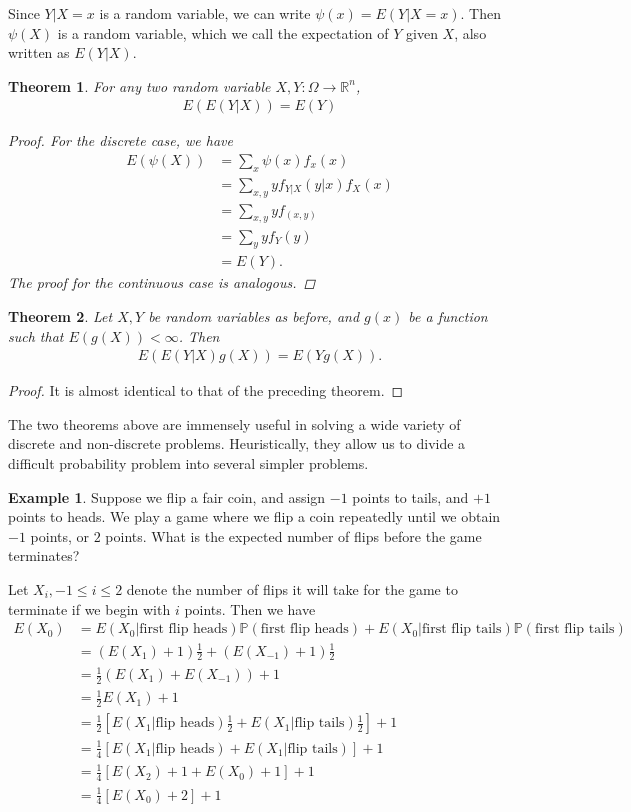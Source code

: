 \documentclass[12pt]{article}
\newcommand{\rr}{\mathbb{R}}
\newcommand{\prob}{\mathbb{P}}
\theoremstyle{plain}
\newtheorem{theorem}{Theorem}
\theoremstyle{definition}
\newtheorem*{example}{Example}
\theoremstyle{remark}
\numberwithin{equation}{section}  %
\begin{document}
Since $Y|X =x$ is a random variable, we can write $\psi(x) = E(Y | X =x)$.
Then $\psi(X)$ is a random variable, which we call the expectation of $Y$ given
$X$, also written as $E(Y|X)$.
\begin{theorem}
	For any two random variable $X,Y: \Omega \to \rr^n$,
	\begin{align*}
		E(E(Y | X)) = E(Y)
	\end{align*}
	\begin{proof}
		For the discrete case, we have
		\begin{align*}
			E(\psi(X)) 
			& = \sum_{x} \psi(x) f_x(x)
			\\
			& = \sum_{x,y} y f_{Y|X}(y|x) f_X(x)
			\\
			& = \sum_{x,y} y f_{(x,y)}
			\\
			& = \sum_y y f_Y(y)
			\\
			& = E(Y).
		\end{align*}
		The proof for the continuous case is analogous. 
	\end{proof}
\end{theorem}
\begin{theorem}
	Let $X,Y$ be random variables as before, and $g(x)$ be a function such that
	$E(g(X))< \infty$. Then
	\begin{align*}
		E(E(Y|X)g(X)) = E(Yg(X)).
	\end{align*}
\end{theorem}
\begin{proof}
	It is almost identical to that of the preceding theorem.
\end{proof}
The two theorems above are immensely useful in solving a wide variety of
discrete and non-discrete problems. Heuristically, they allow us to divide a
difficult probability problem into several simpler problems.
\begin{example}
	Suppose we flip a fair coin, and assign $-1$ points to tails, and $+1$ 
	points to
	heads. We play a game where we flip a coin repeatedly until we obtain
	$-1$ points, or $2$ points. What is the expected number of flips before the
	game terminates? 
\end{example}
Let $X_i, -1 \le i \le 2$ denote the number of flips it will take for the game
to terminate if we begin with $i$ points. Then we have
\begin{align*}
	E(X_0) & = E(X_0 | \text{first flip heads})\prob(\text{first flip heads}) +
	E(X_0 | \text{first flip tails}) \prob(\text{first flip tails})
	\\
	& = (E(X_1) + 1) \frac{1}{2} + (E(X_{-1}) + 1) \frac{1}{2}
	\\
	& = \frac{1}{2}(E(X_1) + E(X_{-1})) + 1
	\\
	& = \frac{1}{2}E(X_1) + 1
	\\
	& = \frac{1}{2}[E(X_1 | \text{flip heads}) \frac{1}{2} + E(X_1 | \text{flip
		tails}) \frac{1}{2}] + 1
	\\
	& = \frac{1}{4}[E(X_1 | \text{flip heads}) + E(X_1 | \text{flip
		tails})] + 1
	\\
	& = \frac{1}{4} [ E(X_2) + 1  + E(X_0) + 1] + 1
	\\
	& = \frac{1}{4}[ E(X_0) + 2] + 1
\end{align*}
\end{document}
